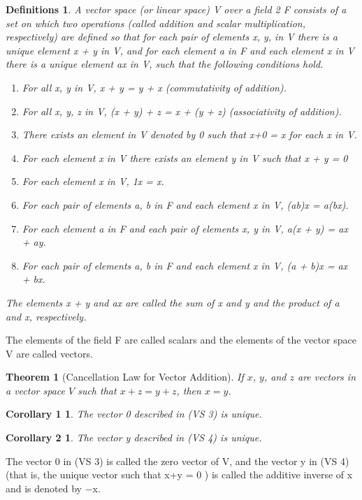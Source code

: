 \documentclass{article}
\theoremstyle{plain}
\newtheorem{theorem}{Theorem}[section]
\newtheorem*{corollary1}{Corollary 1}
\newtheorem*{corollary2}{Corollary 2}
\newtheorem*{definitions}{Definitions}
\theoremstyle{plain} %
\begin{document}
\begin{definitions}
A vector space (or linear space) V over a field 2 F
consists of a set on which two operations (called addition and scalar multiplication, respectively) are defined so that for each pair of elements x, y,
in V there is a unique element x + y in V, and for each element a in F and
each element x in V there is a unique element ax in V, such that the following
conditions hold.
\begin{enumerate}[label=(VS~\arabic*)]
\item For all x, y in V, x + y = y + x (commutativity of addition).
\item For all x, y, z in V, (x + y) + z = x + (y + z) (associativity of addition).
\item There exists an element in V denoted by 0 such that x+0 = x for each x in V.
\item For each element x in V there exists an element y in V such that x + y = 0
\item For each element x in V, 1x = x.
\item For each pair of elements a, b in F and each element x in V, (ab)x = a(bx).
\item For each element a in F and each pair of elements x, y in V, a(x + y) = ax + ay.
\item For each pair of elements a, b in F and each element x in V, (a + b)x = ax + bx.
\end{enumerate}
The elements x + y and ax are called the sum of x and y and the product of a and x, respectively.
\end{definitions}

The elements of the field F are called scalars and the elements of the vector space V are called vectors.

\begin{theorem}[Cancellation Law for Vector Addition]
If $x$, $y$, and $z$ are vectors in a vector space $V$ such that $x + z = y + z$, then $x = y$.
\end{theorem}

\begin{corollary1}
The vector 0 described in (VS 3) is unique.
\end{corollary1}

\begin{corollary2}
The vector y described in (VS 4) is unique.
\end{corollary2}

The vector 0 in (VS 3) is called the zero vector of V, and the vector y in
(VS 4) (that is, the unique vector such that x+y = 0 ) is called the additive
inverse of x and is denoted by −x.
\end{document}
